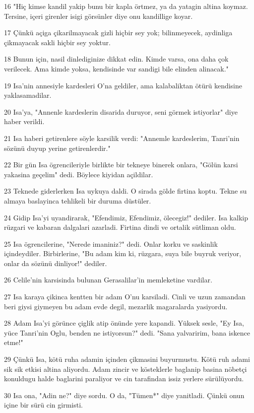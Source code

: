 \par 16 "Hiç kimse kandil yakip bunu bir kapla örtmez, ya da yatagin altina koymaz. Tersine, içeri girenler isigi görsünler diye onu kandillige koyar.
\par 17 Çünkü açiga çikarilmayacak gizli hiçbir sey yok; bilinmeyecek, aydinliga çikmayacak sakli hiçbir sey yoktur.
\par 18 Bunun için, nasil dinlediginize dikkat edin. Kimde varsa, ona daha çok verilecek. Ama kimde yoksa, kendisinde var sandigi bile elinden alinacak."
\par 19 Isa'nin annesiyle kardesleri O'na geldiler, ama kalabaliktan ötürü kendisine yaklasamadilar.
\par 20 Isa'ya, "Annenle kardeslerin disarida duruyor, seni görmek istiyorlar" diye haber verildi.
\par 21 Isa haberi getirenlere söyle karsilik verdi: "Annemle kardeslerim, Tanri'nin sözünü duyup yerine getirenlerdir."
\par 22 Bir gün Isa ögrencileriyle birlikte bir tekneye binerek onlara, "Gölün karsi yakasina geçelim" dedi. Böylece kiyidan açildilar.
\par 23 Teknede giderlerken Isa uykuya daldi. O sirada gölde firtina koptu. Tekne su almaya baslayinca tehlikeli bir duruma düstüler.
\par 24 Gidip Isa'yi uyandirarak, "Efendimiz, Efendimiz, ölecegiz!" dediler. Isa kalkip rüzgari ve kabaran dalgalari azarladi. Firtina dindi ve ortalik sütliman oldu.
\par 25 Isa ögrencilerine, "Nerede imaniniz?" dedi. Onlar korku ve saskinlik içindeydiler. Birbirlerine, "Bu adam kim ki, rüzgara, suya bile buyruk veriyor, onlar da sözünü dinliyor!" dediler.
\par 26 Celile'nin karsisinda bulunan Gerasalilar'in memleketine vardilar.
\par 27 Isa karaya çikinca kentten bir adam O'nu karsiladi. Cinli ve uzun zamandan beri giysi giymeyen bu adam evde degil, mezarlik magaralarda yasiyordu.
\par 28 Adam Isa'yi görünce çiglik atip önünde yere kapandi. Yüksek sesle, "Ey Isa, yüce Tanri'nin Oglu, benden ne istiyorsun?" dedi. "Sana yalvaririm, bana iskence etme!"
\par 29 Çünkü Isa, kötü ruha adamin içinden çikmasini buyurmustu. Kötü ruh adami sik sik etkisi altina aliyordu. Adam zincir ve kösteklerle baglanip basina nöbetçi konuldugu halde baglarini paraliyor ve cin tarafindan issiz yerlere sürülüyordu.
\par 30 Isa ona, "Adin ne?" diye sordu. O da, "Tümen*" diye yanitladi. Çünkü onun içine bir sürü cin girmisti.
